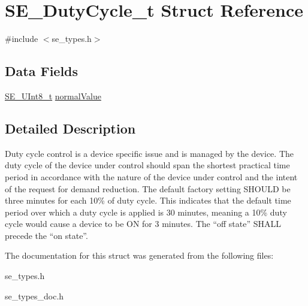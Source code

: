 \hypertarget{structSE__DutyCycle__t}{}\section{S\+E\+\_\+\+Duty\+Cycle\+\_\+t Struct Reference}
\label{structSE__DutyCycle__t}


{\ttfamily \#include $<$se\+\_\+types.\+h$>$}

\subsection*{Data Fields}
\begin{DoxyCompactItemize}
\item 
\hyperlink{group__UInt8_gaf7c365a1acfe204e3a67c16ed44572f5}{S\+E\+\_\+\+U\+Int8\+\_\+t} \hyperlink{group__DutyCycle_ga11141a0c1bf2a7bdbf3d85b845792070}{normal\+Value}
\end{DoxyCompactItemize}


\subsection{Detailed Description}
Duty cycle control is a device specific issue and is managed by the device. The duty cycle of the device under control should span the shortest practical time period in accordance with the nature of the device under control and the intent of the request for demand reduction. The default factory setting S\+H\+O\+U\+LD be three minutes for each 10\% of duty cycle. This indicates that the default time period over which a duty cycle is applied is 30 minutes, meaning a 10\% duty cycle would cause a device to be ON for 3 minutes. The “off state” S\+H\+A\+LL precede the “on state”. 

The documentation for this struct was generated from the following files\+:\begin{DoxyCompactItemize}
\item 
se\+\_\+types.\+h\item 
se\+\_\+types\+\_\+doc.\+h\end{DoxyCompactItemize}
